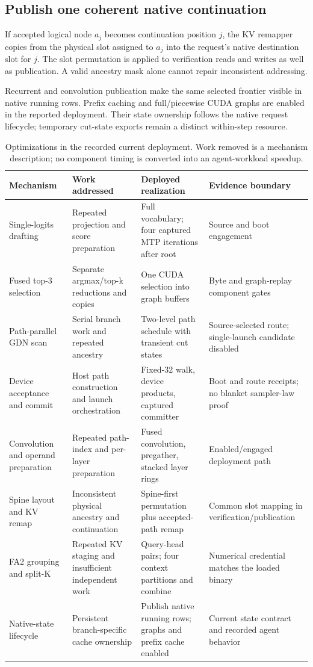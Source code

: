 \documentclass[conference]{IEEEtran}
\begin{document}
\subsection{Publish one coherent native continuation}
If accepted logical node $a_j$ becomes continuation position $j$, the KV remapper copies from the physical slot assigned to $a_j$ into the request's native destination slot for $j$. The slot permutation is applied to verification reads and writes as well as publication. A valid ancestry mask alone cannot repair inconsistent addressing.

Recurrent and convolution publication make the same selected frontier visible in native running rows. Prefix caching and full/piecewise CUDA graphs are enabled in the reported deployment. Their state ownership follows the native request lifecycle; temporary cut-state exports remain a distinct within-step resource.

\begin{table}[t]
\caption{Optimizations in the recorded current deployment. Work removed is a mechanism description; no component timing is converted into an agent-workload speedup.}
\label{tab:optimization-map}
\centering\footnotesize
\begin{tabularx}{\textwidth}{@{}p{}YYY@{}}
\toprule
Mechanism & Work addressed & Deployed realization & Evidence boundary \\
\midrule
Single-logits drafting & Repeated projection and score preparation & Full vocabulary; four captured MTP iterations after root & Source and boot engagement \\
Fused top-3 selection & Separate argmax/top-k reductions and copies & One CUDA selection into graph buffers & Byte and graph-replay component gates \\
Path-parallel GDN scan & Serial branch work and repeated ancestry & Two-level path schedule with transient cut states & Source-selected route; single-launch candidate disabled \\
Device acceptance and commit & Host path construction and launch orchestration & Fixed-32 walk, device products, captured committer & Boot and route receipts; no blanket sampler-law proof \\
Convolution and operand preparation & Repeated path-index and per-layer preparation & Fused convolution, pregather, stacked layer rings & Enabled/engaged deployment path \\
Spine layout and KV remap & Inconsistent physical ancestry and continuation & Spine-first permutation plus accepted-path remap & Common slot mapping in verification/publication \\
FA2 grouping and split-K & Repeated KV staging and insufficient independent work & Query-head pairs; four context partitions and combine & Numerical credential matches the loaded binary \\
Native-state lifecycle & Persistent branch-specific cache ownership & Publish native running rows; graphs and prefix cache enabled & Current state contract and recorded agent behavior \\
\bottomrule
\end{tabularx}
\end{table}
\end{document}
